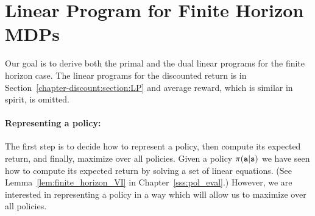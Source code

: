 
\section{Linear Program for Finite Horizon MDPs}
\label{C-MDP-FH:sec:LP}

Our goal is to derive both the primal and the dual linear programs for the finite horizon case. The linear programs for the discounted return is in Section~\ref{chapter-discount:section:LP} and average reward, which is similar in spirit, is omitted.

\paragraph{Representing a policy:}
The first step is to decide how to represent a policy, then compute its expected return, and finally, maximize over all policies.
Given a policy $\pi({\tt a}|{\tt s})$ we have seen how to compute its expected return by solving a set of linear equations. (See Lemma~\ref{lem:finite_horizon_VI} in Chapter~\ref{sss:pol_eval}.)
However, we are interested in representing a policy in a way which will allow us to maximize over all policies.

